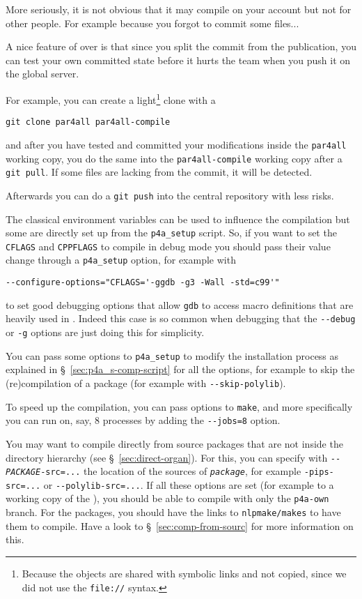 \documentclass[a4paper]{article}
\begin{document}
More seriously, it is not obvious that it may compile on your account but
not for other people. For example because you forgot to commit some
files...

A nice feature of \Agit over \Asvn is that since you split the commit from
the publication, you can test your own committed state before it hurts the
team when you push it on the global server.

For example, you can create a light\footnote{Because the objects are
  shared with symbolic links and not copied, since we did not use the
  \texttt{file://} syntax.} clone with a
\begin{verbatim}
git clone par4all par4all-compile
\end{verbatim}
and after you have tested and committed your modifications inside the
\texttt{par4all} working copy, you do the same into the
\texttt{par4all-compile} working copy after a \texttt{git pull}.
If some files are lacking from the commit, it will be detected.

Afterwards you can do a \texttt{git push} into the central \Apfa
repository with less risks.

The classical \Aautotools environment variables can be used to influence
the compilation but some are directly set up from the \verb|p4a_setup|
script. So, if you want to set the \texttt{CFLAGS} and \texttt{CPPFLAGS}
to compile \Apfa in debug mode you should pass their value change through
a \verb|p4a_setup| option, for example with
\begin{verbatim}
--configure-options="CFLAGS='-ggdb -g3 -Wall -std=c99'"
\end{verbatim}
to set good debugging options that allow \texttt{gdb} to access macro
definitions that are heavily used in \Apips. Indeed this case is so common
when debugging \Apfa that the \verb|--debug| or \verb|-g| options are just
doing this for simplicity.

You can pass some options to \verb|p4a_setup| to modify the
installation process as explained in \S~\ref{sec:p4a_s-comp-script} for
all the options, for example to skip the (re)compilation of a package (for
example with \verb/--skip-polylib/).

To speed up the compilation, you can pass options to \texttt{make}, and more
specifically you can run on, say, 8 processes by adding the
\verb/--jobs=8/ option.

You may want to compile \Apfa directly from source packages that are not
inside the \Apfa directory hierarchy (see \S~\ref{sec:direct-organ}). For
this, you can specify with \texttt{-{}-\emph{PACKAGE}-src=...} the
location of the sources of \texttt{\emph{package}}, for example
\verb|-pips-src=...| or \verb|--polylib-src=...|. If all these options are
set (for example to a working copy of the \Apips{} \Asvn), you should be
able to compile with only the \texttt{p4a-own} branch. For the \Apips
packages, you should have the links to \texttt{nlpmake/makes} to have them
to compile. Have a look to \S~\ref{sec:comp-from-sourc} for more
information on this.
\end{document}
